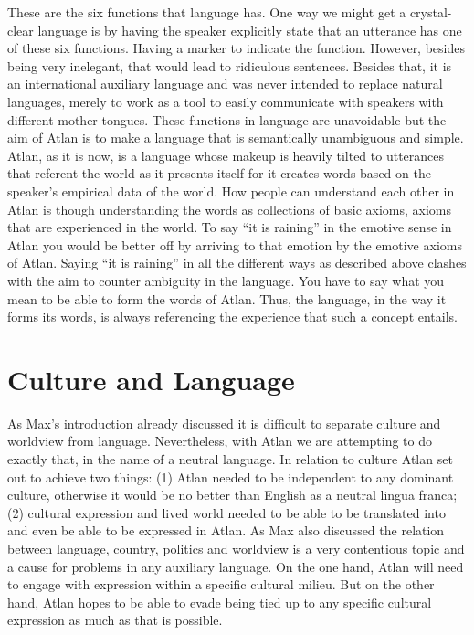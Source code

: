 These are the six functions that language has. One way we might get a crystal-clear language is by having the speaker explicitly state that an utterance has one of these six functions. Having a marker to indicate the function. However, besides being very inelegant, that would lead to ridiculous sentences. Besides that, it is an international auxiliary language and was never intended to replace natural languages, merely to work as a tool to easily communicate with speakers with different mother tongues. These functions in language are unavoidable but the aim of Atlan is to make a language that is semantically unambiguous and simple. Atlan, as it is now, is a language whose makeup is heavily tilted to utterances that referent the world as it presents itself for it creates words based on the speaker's empirical data of the world. How people can understand each other in Atlan is though understanding the words as collections of basic axioms, axioms that are experienced in the world. To say “it is raining” in the emotive sense in Atlan you would be better off by arriving to that emotion by the emotive axioms of Atlan. Saying “it is raining” in all the different ways as described above clashes with the aim to counter ambiguity in the language. You have to say what you mean to be able to form the words of Atlan. Thus, the language, in the way it forms its words, is always referencing the experience that such a concept entails.   

\section{Culture and Language}


As Max’s introduction already discussed it is difficult to separate culture and worldview from language. Nevertheless, with Atlan we are attempting to do exactly that, in the name of a neutral language. In relation to culture Atlan set out to achieve two things: (1) Atlan needed to be independent to any dominant culture, otherwise it would be no better than English as a neutral lingua franca; (2) cultural expression and lived world needed to be able to be translated into and even be able to be expressed in Atlan. As Max also discussed the relation between language, country, politics and worldview is a very contentious topic and a cause for problems in any auxiliary language. On the one hand, Atlan will need to engage with expression within a specific cultural milieu. But on the other hand, Atlan hopes to be able to evade being tied up to any specific cultural expression as much as that is possible.				 		

